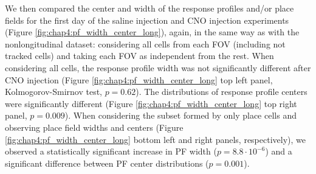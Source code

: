 We then compared the center and width of the response profiles and/or place fields for the first day of the saline injection and CNO injection experiments (Figure \ref{fig:chap4:pf_width_center_long}), again, in the same way as with the nonlongitudinal dataset: considering all cells from each FOV (including not tracked cells) and taking each FOV as independent from the rest.
When considering all cells, the response profile width was not significantly different after CNO injection (Figure \ref{fig:chap4:pf_width_center_long} top left panel, Kolmogorov-Smirnov test, $p=0.62$).
The distributions of response profile centers were significantly different (Figure \ref{fig:chap4:pf_width_center_long} top right panel, $p=0.009$).
When considering the subset formed by only place cells and observing place field widths and centers (Figure \ref{fig:chap4:pf_width_center_long} bottom left and right panels, respectively), we observed a statistically significant increase in PF width ($p=8.8 \cdot 10^{-6}$) and a significant difference between PF center distributions ($p=0.001$).

